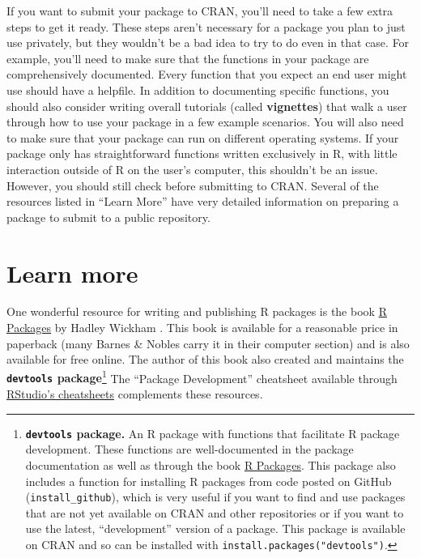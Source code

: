 \documentclass[]{tufte-book}
\begin{document}
If you want to submit your package to CRAN, you'll need to take a few extra
steps to get it ready. These steps aren't necessary for a package you plan to
just use privately, but they wouldn't be a bad idea to try to do even in that
case. For example, you'll need to make sure that the functions in your package
are comprehensively documented. Every function that you expect an end user might
use should have a helpfile. In addition to documenting specific functions, you
should also consider writing overall tutorials (called \textbf{vignettes}) that walk
a user through how to use your package in a few example scenarios. You will also
need to make sure that your package can run on different operating systems. If
your package only has straightforward functions written exclusively in R, with
little interaction outside of R on the user's computer, this shouldn't be an
issue. However, you should still check before submitting to CRAN. Several of the
resources listed in ``Learn More'' have very detailed information on preparing a
package to submit to a public repository.

\hypertarget{learn-more-2}{%
\section{Learn more}\label{learn-more-2}}

One wonderful resource for writing and publishing R packages is the book \href{http://r-pkgs.had.co.nz/}{R
Packages} by Hadley Wickham \citep{wickham2015r}. This book
is available for a reasonable price in paperback (many Barnes \& Nobles carry it
in their computer section) and is also available for free online. The author of
this book also created and maintains the \textbf{\texttt{devtools} package}\footnote{\textbf{\texttt{devtools}
  package.} An R package with functions that facilitate R package development.
  These functions are well-documented in the package documentation as well as
  through the book \href{http://r-pkgs.had.co.nz/}{R Packages}. This package also
  includes a function for installing R packages from code posted on GitHub
  (\texttt{install\_github}), which is very useful if you want to find and use packages
  that are not yet available on CRAN and other repositories or if you want to use
  the latest, ``development'' version of a package. This package is available on
  CRAN and so can be installed with \texttt{install.packages("devtools")}.} The ``Package
Development'' cheatsheet available through \href{https://www.rstudio.com/resources/cheatsheets/}{RStudio's
cheatsheets} complements these
resources.
\end{document}
